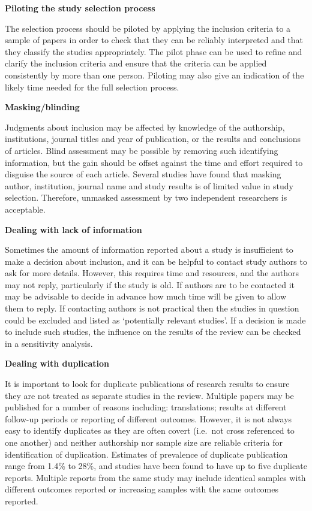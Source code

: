 \documentclass[
  11pt,
  a4paper,
  DIV=11,
  numbers=noendperiod]{scrreprt}
\begin{document}
\textbf{Piloting the study selection process}

The selection process should be piloted by applying the inclusion
criteria to a sample of papers in order to check that they can be
reliably interpreted and that they classify the studies appropriately.
The pilot phase can be used to refine and clarify the inclusion criteria
and ensure that the criteria can be applied consistently by more than
one person. Piloting may also give an indication of the likely time
needed for the full selection process.

\textbf{Masking/blinding}

Judgments about inclusion may be affected by knowledge of the
authorship, institutions, journal titles and year of publication, or the
results and conclusions of articles. Blind assessment may be possible by
removing such identifying information, but the gain should be offset
against the time and effort required to disguise the source of each
article. Several studies have found that masking author, institution,
journal name and study results is of limited value in study selection.
Therefore, unmasked assessment by two independent researchers is
acceptable.

\textbf{Dealing with lack of information}

Sometimes the amount of information reported about a study is
insufficient to make a decision about inclusion, and it can be helpful
to contact study authors to ask for more details. However, this requires
time and resources, and the authors may not reply, particularly if the
study is old. If authors are to be contacted it may be advisable to
decide in advance how much time will be given to allow them to reply. If
contacting authors is not practical then the studies in question could
be excluded and listed as `potentially relevant studies'. If a decision
is made to include such studies, the influence on the results of the
review can be checked in a sensitivity analysis.

\textbf{Dealing with duplication}

It is important to look for duplicate publications of research results
to ensure they are not treated as separate studies in the review.
Multiple papers may be published for a number of reasons including:
translations; results at different follow-up periods or reporting of
different outcomes. However, it is not always easy to identify
duplicates as they are often covert (i.e.~not cross referenced to one
another) and neither authorship nor sample size are reliable criteria
for identification of duplication. Estimates of prevalence of duplicate
publication range from 1.4\% to 28\%, and studies have been found to
have up to five duplicate reports. Multiple reports from the same study
may include identical samples with different outcomes reported or
increasing samples with the same outcomes reported.
\end{document}
